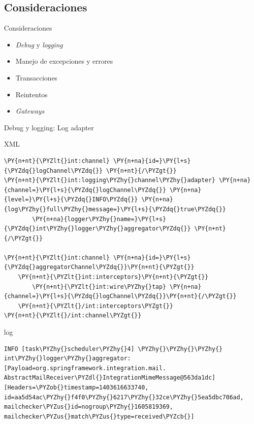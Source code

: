\documentclass{beamer}
\begin{document}
\subsection{Consideraciones}
\begin{frame}{Consideraciones}
\begin{itemize}
\item \textit{Debug} y \textit{logging}
\item Manejo de excepciones y errores
\item Transacciones
\item Reintentos
\item \textit{Gateways}
\end{itemize}
\end{frame}

\begin{frame}[fragile]{Debug y logging: Log adapter}

{\small XML}
\begin{Verbatim}[fontsize=\tiny,commandchars=\\\{\}]
\PY{n+nt}{\PYZlt{}int:channel} \PY{n+na}{id=}\PY{l+s}{\PYZdq{}logChannel\PYZdq{}} \PY{n+nt}{/\PYZgt{}}
\PY{n+nt}{\PYZlt{}int:logging\PYZhy{}channel\PYZhy{}adapter} \PY{n+na}{channel=}\PY{l+s}{\PYZdq{}logChannel\PYZdq{}} \PY{n+na}{level=}\PY{l+s}{\PYZdq{}INFO\PYZdq{}} \PY{n+na}{log\PYZhy{}full\PYZhy{}message=}\PY{l+s}{\PYZdq{}true\PYZdq{}} 
        \PY{n+na}{logger\PYZhy{}name=}\PY{l+s}{\PYZdq{}int\PYZhy{}logger\PYZhy{}aggregator\PYZdq{}} \PY{n+nt}{/\PYZgt{}}

\PY{n+nt}{\PYZlt{}int:channel} \PY{n+na}{id=}\PY{l+s}{\PYZdq{}aggregatorChannel\PYZdq{}}\PY{n+nt}{\PYZgt{}}
    \PY{n+nt}{\PYZlt{}int:interceptors}\PY{n+nt}{\PYZgt{}}
        \PY{n+nt}{\PYZlt{}int:wire\PYZhy{}tap} \PY{n+na}{channel=}\PY{l+s}{\PYZdq{}logChannel\PYZdq{}}\PY{n+nt}{/\PYZgt{}}
    \PY{n+nt}{\PYZlt{}/int:interceptors\PYZgt{}}
\PY{n+nt}{\PYZlt{}/int:channel\PYZgt{}}
\end{Verbatim}

{\small log}
\begin{Verbatim}[fontsize=\tiny,commandchars=\\\{\}]
INFO [task\PYZhy{}scheduler\PYZhy{}4] \PYZhy{}\PYZhy{}\PYZhy{} int\PYZhy{}logger\PYZhy{}aggregator: [Payload=org.springframework.integration.mail.
AbstractMailReceiver\PYZdl{}IntegrationMimeMessage@563da1dc][Headers=\PYZob{}timestamp=1403616633740,
id=aa5d54ac\PYZhy{}f4f0\PYZhy{}6217\PYZhy{}32ce\PYZhy{}5ea5dbc706ad, mailchecker\PYZus{}id=nogroup\PYZhy{}1605819369,
mailchecker\PYZus{}match\PYZus{}type=received\PYZcb{}]
\end{Verbatim}
\end{frame}
\end{document}
